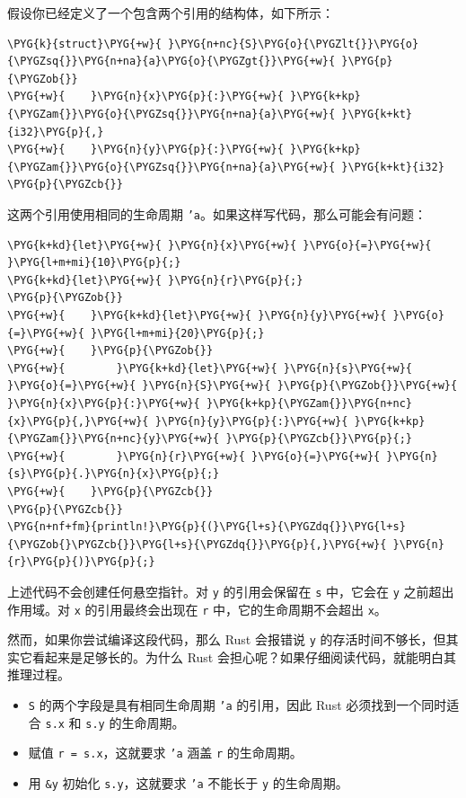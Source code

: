 假设你已经定义了一个包含两个引用的结构体，如下所示：

\begin{Verbatim}[commandchars=\\\{\},breaklines=true,breakanywhere=true,fontsize=\codefont,xleftmargin=17bp]
\PYG{k}{struct}\PYG{+w}{ }\PYG{n+nc}{S}\PYG{o}{\PYGZlt{}}\PYG{o}{\PYGZsq{}}\PYG{n+na}{a}\PYG{o}{\PYGZgt{}}\PYG{+w}{ }\PYG{p}{\PYGZob{}}
\PYG{+w}{    }\PYG{n}{x}\PYG{p}{:}\PYG{+w}{ }\PYG{k+kp}{\PYGZam{}}\PYG{o}{\PYGZsq{}}\PYG{n+na}{a}\PYG{+w}{ }\PYG{k+kt}{i32}\PYG{p}{,}
\PYG{+w}{    }\PYG{n}{y}\PYG{p}{:}\PYG{+w}{ }\PYG{k+kp}{\PYGZam{}}\PYG{o}{\PYGZsq{}}\PYG{n+na}{a}\PYG{+w}{ }\PYG{k+kt}{i32}
\PYG{p}{\PYGZcb{}}
\end{Verbatim}

这两个引用使用相同的生命周期 \texttt{'a}。如果这样写代码，那么可能会有问题：

\begin{Verbatim}[commandchars=\\\{\},breaklines=true,breakanywhere=true,fontsize=\codefont,xleftmargin=17bp]
\PYG{k+kd}{let}\PYG{+w}{ }\PYG{n}{x}\PYG{+w}{ }\PYG{o}{=}\PYG{+w}{ }\PYG{l+m+mi}{10}\PYG{p}{;}
\PYG{k+kd}{let}\PYG{+w}{ }\PYG{n}{r}\PYG{p}{;}
\PYG{p}{\PYGZob{}}
\PYG{+w}{    }\PYG{k+kd}{let}\PYG{+w}{ }\PYG{n}{y}\PYG{+w}{ }\PYG{o}{=}\PYG{+w}{ }\PYG{l+m+mi}{20}\PYG{p}{;}
\PYG{+w}{    }\PYG{p}{\PYGZob{}}
\PYG{+w}{        }\PYG{k+kd}{let}\PYG{+w}{ }\PYG{n}{s}\PYG{+w}{ }\PYG{o}{=}\PYG{+w}{ }\PYG{n}{S}\PYG{+w}{ }\PYG{p}{\PYGZob{}}\PYG{+w}{ }\PYG{n}{x}\PYG{p}{:}\PYG{+w}{ }\PYG{k+kp}{\PYGZam{}}\PYG{n+nc}{x}\PYG{p}{,}\PYG{+w}{ }\PYG{n}{y}\PYG{p}{:}\PYG{+w}{ }\PYG{k+kp}{\PYGZam{}}\PYG{n+nc}{y}\PYG{+w}{ }\PYG{p}{\PYGZcb{}}\PYG{p}{;}
\PYG{+w}{        }\PYG{n}{r}\PYG{+w}{ }\PYG{o}{=}\PYG{+w}{ }\PYG{n}{s}\PYG{p}{.}\PYG{n}{x}\PYG{p}{;}
\PYG{+w}{    }\PYG{p}{\PYGZcb{}}
\PYG{p}{\PYGZcb{}}
\PYG{n+nf+fm}{println!}\PYG{p}{(}\PYG{l+s}{\PYGZdq{}}\PYG{l+s}{\PYGZob{}\PYGZcb{}}\PYG{l+s}{\PYGZdq{}}\PYG{p}{,}\PYG{+w}{ }\PYG{n}{r}\PYG{p}{)}\PYG{p}{;}
\end{Verbatim}

上述代码不会创建任何悬空指针。对 \texttt{y} 的引用会保留在 \texttt{s} 中，它会在 \texttt{y} 之前超出作用域。对 \texttt{x} 的引用最终会出现在 \texttt{r} 中，它的生命周期不会超出 \texttt{x}。

然而，如果你尝试编译这段代码，那么 Rust 会报错说 \texttt{y} 的存活时间不够长，但其实它看起来是足够长的。为什么 Rust 会担心呢？如果仔细阅读代码，就能明白其推理过程。

\begin{itemize}
\item \texttt{S} 的两个字段是具有相同生命周期 \texttt{'a} 的引用，因此 Rust 必须找到一个同时适合 \texttt{s.x} 和 \texttt{s.y} 的生命周期。
\item 赋值 \texttt{r = s.x}，这就要求 \texttt{'a} 涵盖 \texttt{r} 的生命周期。
\item 用 \texttt{\&y} 初始化 \texttt{s.y}，这就要求 \texttt{'a} 不能长于 \texttt{y} 的生命周期。
\end{itemize}

